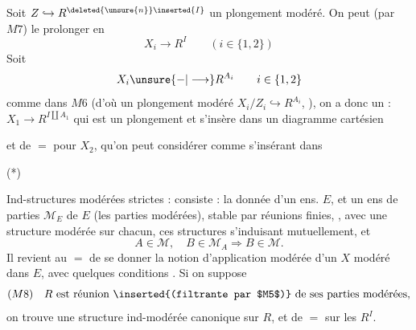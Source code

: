 Soit $Z\hookrightarrow R^{\deleted{\unsure{n}}\inserted{I}}$ un plongement modéré. On peut (par $M7$) le prolonger en
\[
 X_i\longrightarrow R^I\qquad(i\in\{1,2\})
\]
Soit
\[
 X_i\unsure{-|\longrightarrow}R^{A_i}\qquad i\in\{1,2\}
\]
comme dans $M6$ (d'où un  plongement modéré $X_i/Z_i\hookrightarrow R^{A_i}$, ), on a donc un : $X_1\longrightarrow R^{I\amalg A_1}$ qui est un plongement et s'insère dans un diagramme cartésien
\par\noindent{}\par
et de $=$ pour $X_2$,  qu'on peut considérer comme  s'insérant dans
\par\noindent(*)\quad{}\par
{}

Ind-structures modérées strictes   : consiste : la donnée d'un ens. $E$, et un ens de parties $\mathcal M_E$ de $E$ (les parties modérées), stable par réunions finies, , avec une structure modérée sur chacun, ces structures s'induisant mutuellement, et
\[
 A\in\mathcal M,\quad B\in\mathcal M_A\Longrightarrow B\in\mathcal M.
\]
Il revient au $=$ de se donner la notion d'application modérée d'un $X$ modéré dans $E$, avec  quelques conditions . Si on suppose
\[
 (M8)\quad R\text{ est réunion \inserted{(filtrante par $M5$)} de ses parties modérées},
\]
on trouve une structure ind-modérée canonique sur $R$, et de $=$ sur les $R^I$.

